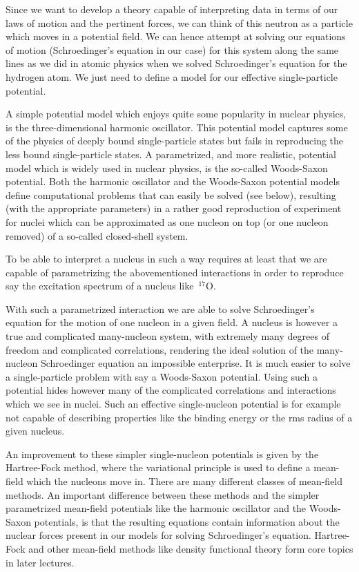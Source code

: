 \documentclass[%
oneside,                 %
final,                   %
10pt]{article}
\begin{document}
Since we want to develop a theory capable of interpreting data in terms of our laws of motion and the pertinent forces,
we can think of this neutron as a particle which moves in a potential field. We can hence attempt at solving our equations of motion (Schroedinger's equation in our case) for this system along the same lines as we did in atomic physics when we solved Schroedinger's equation for the hydrogen atom. We just need to define a model for our effective single-particle potential. 

A simple potential model which enjoys quite some popularity in nuclear physics, is the three-dimensional harmonic oscillator. This potential model captures some of the physics of deeply bound single-particle states but fails in reproducing 
the less bound single-particle states. A parametrized, and more realistic,  potential model which is widely used in nuclear physics, is the so-called Woods-Saxon potential. Both the harmonic oscillator and the Woods-Saxon potential models define computational problems that can easily be solved (see below), resulting (with the appropriate parameters) in a rather good reproduction of experiment for nuclei which can be approximated as one nucleon on top (or one nucleon removed) of a so-called closed-shell system.



To be able to interpret a nucleus in such  a way requires at least that we are capable of parametrizing the abovementioned
interactions in order to reproduce say the excitation spectrum of a nucleus like $\,{}^{17}\mbox{O}$. 

With such a parametrized interaction we are able to solve Schroedinger's equation for the motion of one nucleon in a given field. A nucleus is however a true and complicated many-nucleon system, with extremely many degrees of freedom and complicated correlations, rendering the ideal solution of the many-nucleon Schroedinger equation an impossible enterprise. It is much easier to solve a single-particle problem with say a Woods-Saxon potential. Using such a potential hides however many of the complicated correlations and interactions which we see in nuclei. Such an effective single-nucleon potential is for example not capable of 
describing properties like the binding energy or the rms radius of a given nucleus. 

An improvement to these simpler single-nucleon potentials is given by the Hartree-Fock method, where the variational principle is used to define a mean-field which the nucleons move in. There are many different classes of mean-field methods.
An important difference between these methods and the simpler parametrized mean-field potentials like the harmonic oscillator and the Woods-Saxon potentials, is that the resulting equations contain information about the nuclear forces present in our models for solving Schroedinger's equation. Hartree-Fock and other mean-field methods like density functional theory form core topics in later lectures.
\end{document}
